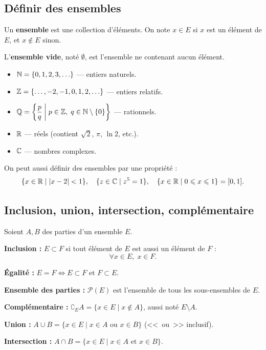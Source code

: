 \subsection{Définir des ensembles}

\begin{defbox}[--- Ensemble]
Un \textbf{ensemble} est une collection d'éléments. On note $x \in E$ si $x$ est un élément de $E$, et $x \notin E$ sinon.

\medskip
L'\textbf{ensemble vide}, noté $\emptyset$, est l'ensemble ne contenant aucun élément.
\end{defbox}

\begin{exbox}
\begin{itemize}[leftmargin=1.5cm]
  \item $\mathbb{N} = \{0, 1, 2, 3, \ldots\}$ --- entiers naturels.
  \item $\mathbb{Z} = \{\ldots, -2, -1, 0, 1, 2, \ldots\}$ --- entiers relatifs.
  \item $\mathbb{Q} = \left\{\dfrac{p}{q} \;\middle|\; p \in \mathbb{Z},\; q \in \mathbb{N} \setminus \{0\}\right\}$ --- rationnels.
  \item $\mathbb{R}$ --- réels (contient $\sqrt{2}$, $\pi$, $\ln 2$, etc.).
  \item $\mathbb{C}$ --- nombres complexes.
\end{itemize}
\end{exbox}

On peut aussi définir des ensembles par une propriété :
\[
\{x \in \mathbb{R} \mid |x - 2| < 1\}, \quad \{z \in \mathbb{C} \mid z^5 = 1\}, \quad \{x \in \mathbb{R} \mid 0 \leqslant x \leqslant 1\} = [0,1].
\]


\subsection{Inclusion, union, intersection, complémentaire}

\begin{defbox}
Soient $A, B$ des parties d'un ensemble $E$.

\medskip
\textbf{Inclusion :} $E \subset F$ si tout élément de $E$ est aussi un élément de $F$ :
\[\forall x \in E,\; x \in F.\]

\textbf{Égalité :} $E = F \iff E \subset F \text{ et } F \subset E.$

\medskip
\textbf{Ensemble des parties :} $\mathcal{P}(E)$ est l'ensemble de tous les sous-ensembles de $E$.

\medskip
\textbf{Complémentaire :} $\complement_E A = \{x \in E \mid x \notin A\}$, aussi noté $E \setminus A$.

\medskip
\textbf{Union :} $A \cup B = \{x \in E \mid x \in A \text{ ou } x \in B\}$ (<<~ou~>> inclusif).

\medskip
\textbf{Intersection :} $A \cap B = \{x \in E \mid x \in A \text{ et } x \in B\}$.
\end{defbox}

